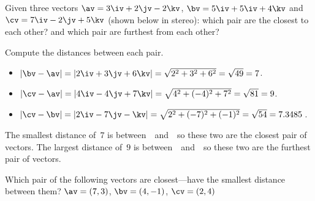 \begin{example} \label{eg:}
Given three vectors \(\av=3\iv+2\jv-2\kv\), \(\bv=5\iv+5\iv+4\kv\) and \(\cv=7\iv-2\jv+5\kv\) (shown below in stereo): which pair are the closest to each other? and which pair are furthest from each other?
\begin{center}
 {}
\end{center}
\begin{solution} 
Compute the distances between each pair.
\begin{itemize}
\item \(|\bv-\av|=|2\iv+3\jv+6\kv| =\sqrt{2^2+3^2+6^2} =\sqrt{49} =7\).
\item \(|\cv-\av|=|4\iv-4\jv+7\kv| =\sqrt{4^2+(-4)^2+7^2} =\sqrt{81} =9\).
\item \(|\cv-\bv|=|2\iv-7\jv-\kv| =\sqrt{2^2+(-7)^2+(-1)^2} =\sqrt{54} =7.3485\)\,.
\end{itemize}
The smallest distance of~\(7\) is between~\av\ and~\bv\ so these two are the closest pair of vectors.
The largest distance of~\(9\) is between~\av\ and~\cv\ so these two are the furthest pair of vectors.
\end{solution}
\end{example}



\begin{activity}
Which pair of the following vectors are closest---have the smallest distance between them?  \(\av=(7,3)\), \(\bv=(4,-1)\), \(\cv=(2,4)\)
\end{activity}










